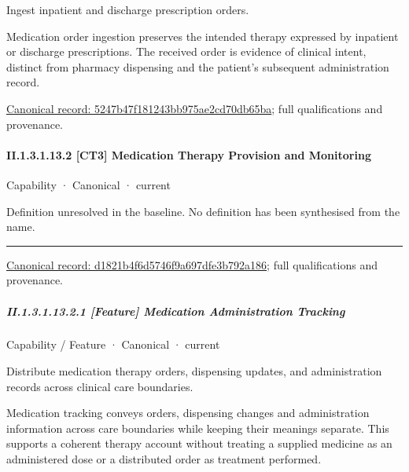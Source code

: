 Ingest inpatient and discharge prescription orders.



Medication order ingestion preserves the intended therapy expressed by inpatient or discharge prescriptions. The received order is evidence of clinical intent, distinct from pharmacy dispensing and the patient's subsequent administration record.


{\footnotesize \href{../../../../continuum/strategy/capability/feature/5247b47f181243bb975ae2cd70db65ba.md}{Canonical record: 5247b47f181243bb975ae2cd70db65ba}; full qualifications and provenance.}\par
\paragraph*{II.1.3.1.13.2 [CT3] Medication Therapy Provision and Monitoring}
\label{navigation:II.1.3.1.13.2}

\label{element:d1821b4f6d5746f9a697dfe3b792a186}
{\small Capability · Canonical · current}\par

Definition unresolved in the baseline. No definition has been synthesised from the name.



\medskip\hrule\medskip

{\footnotesize \href{../../../../continuum/strategy/capability/d1821b4f6d5746f9a697dfe3b792a186.md}{Canonical record: d1821b4f6d5746f9a697dfe3b792a186}; full qualifications and provenance.}\par
\subparagraph*{II.1.3.1.13.2.1 [Feature] Medication Administration Tracking}
\label{navigation:II.1.3.1.13.2.1}

\label{element:6e01c72ef9c149e2ac231463810c2265}
{\small Capability / Feature · Canonical · current}\par

Distribute medication therapy orders, dispensing updates, and administration records across clinical care boundaries.



Medication tracking conveys orders, dispensing changes and administration information across care boundaries while keeping their meanings separate. This supports a coherent therapy account without treating a supplied medicine as an administered dose or a distributed order as treatment performed.


